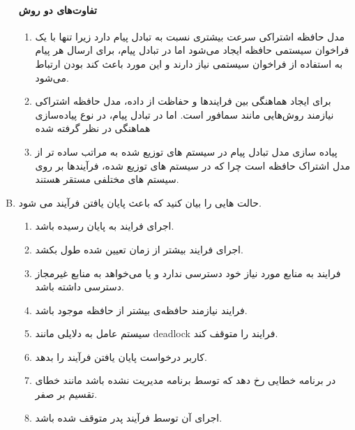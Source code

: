 \documentclass[]{article}
\begin{document}
\begin{enumerate}[(A)]
          \paragraph*{تفاوت‌های دو روش}
          \begin{enumerate}[1.]
              \item مدل حافظه اشتراکی سرعت بیشتری نسبت به تبادل پیام دارد زیرا تنها با یک فراخوان سیستمی حافظه ایجاد می‌شود
                    اما در تبادل پیام، برای ارسال هر پیام به استفاده از فراخوان سیستمی نیاز دارند و این مورد باعث کند بودن ارتباط می‌شود.
              \item برای ایجاد هماهنگی بین فرایندها و حفاظت از داده، مدل حافظه اشتراکی نیازمند روش‌هایی مانند سمافور است.
                    اما در تبادل پیام، در نوع پیاده‌سازی هماهنگی در نظر گرفته شده
              \item پیاده سازی مدل تبادل پیام در سیستم های توزیع شده به مراتب ساده تر از مدل اشتراک حافظه است چرا که در سیستم های توزیع شده، فرآیندها بر روی سیستم های مختلفی مستقر هستند.
          \end{enumerate}

          \pagebreak

    \item ﺣﺎﻟﺖ ﻫﺎﯾﯽ ﺭﺍ ﺑﯿﺎﻥ ﮐﻨﯿﺪ ﮐﻪ ﺑﺎﻋﺚ ﭘﺎﯾﺎﻥ ﯾﺎﻓﺘﻦ ﻓﺮﺁﯾﻨﺪ ﻣﯽ ﺷﻮﺩ.
          \begin{enumerate}[-]
              \item اجرای فرایند به پایان رسیده باشد.
              \item اجرای فرایند بیشتر از زمان تعیین شده طول بکشد.
              \item فرایند به منابع مورد نیاز خود دسترسی ندارد و یا می‌خواهد به منابع غیرمجاز دسترسی داشته باشد.
              \item فرایند نیازمند حافظه‌ی بیشتر از حافظه موجود باشد.
              \item سیستم عامل به دلایلی مانند deadlock فرایند را متوقف کند.
              \item کاربر درخواست پایان یافتن فرآیند را بدهد.
              \item در برنامه خطایی رخ دهد که توسط برنامه مدیریت نشده باشد مانند خطای تقسیم بر صفر.
              \item اجرای آن توسط فرآیند پدر متوقف شده باشد.
          \end{enumerate}


\end{enumerate}
\end{document}

